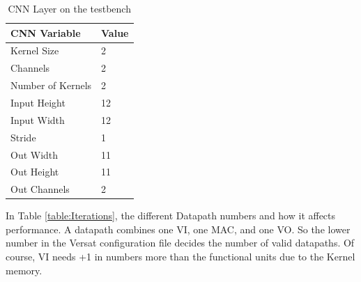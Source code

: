 \documentclass[conference]{IEEEtran}
\begin{document}
\begin{table}[!htpb]
    \centering
    \begin{tabular}{ll}
    \hline
    \textbf{CNN Variable} & \textbf{Value}        \\ \hline
    Kernel Size            & 2                 \\
    Channels            & 2                       \\
    Number of Kernels            & 2                       \\
    Input Height                  & 12                        \\
    Input Width                & 12                  \\
    Stride              & 1                     \\
    Out Width               & 11                      \\
    Out Height            & 11  \\
    Out Channels                   & 2                     \\ \hline
    \end{tabular}
    \label{table:convInput}
    \linebreak
    \caption{CNN Layer on the testbench}
\end{table}



In Table \ref{table:Iterations}, the different Datapath numbers and how it affects performance.
A datapath combines one VI, one MAC, and one VO. So the lower number in the Versat configuration file
decides the number of valid datapaths. Of course, VI needs +1 in numbers more than the functional units due to the Kernel memory.
\end{document}
